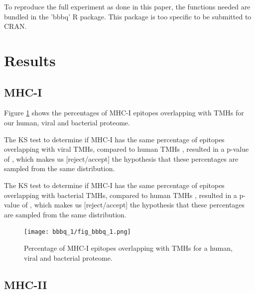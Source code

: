 To reproduce the full experiment as done in this paper,
the functions needed are bundled in the 'bbbq' R package.
This package is too specific to be submitted to CRAN.

\section{Results}

\subsection{MHC-I}

Figure \ref{fig:1} shows the percentages of MHC-I epitopes overlapping 
with TMHs for our human, viral and bacterial proteome.

The KS test to determine if MHC-I has the same percentage 
of epitopes overlapping with viral TMHs, 
compared to human TMHs ,
resulted in a p-value of ,
which makes us [reject/accept] the hypothesis that these percentages
are sampled from the same distribution. 

The KS test to determine if MHC-I has the same percentage 
of epitopes overlapping with bacterial TMHs, 
compared to human TMHs ,
resulted in a p-value of ,
which makes us [reject/accept] the hypothesis that these percentages
are sampled from the same distribution. 

\begin{figure}[!htbp]
  \texttt{[image: bbbq\_1/fig\_bbbq\_1.png]}
  \caption{
    Percentage of MHC-I epitopes overlapping with TMHs
    for a human, viral and bacterial proteome.
  }
  \label{fig:1}
\end{figure}

\subsection{MHC-II}

